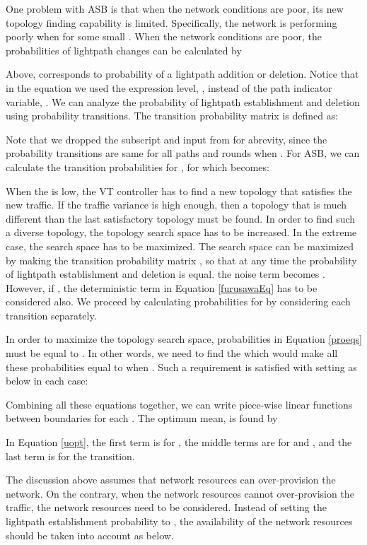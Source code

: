 \documentclass[conference]{IEEEtran}
\begin{document}
One problem with ASB is that when the network conditions are poor, its new topology finding capability is limited.
Specifically, the network is performing poorly when  for some small .
When the network conditions are poor, the probabilities of lightpath changes can be calculated by 
\par\nobreak \vspace{-0.24cm}
{\small }Above,  corresponds to probability of a lightpath addition or deletion.
Notice that in the equation we used the expression level, , instead of the path indicator variable, . We can analyze the probability of lightpath establishment and deletion using probability transitions.
The transition probability matrix  is defined as:
     
Note that we dropped the subscript  and input  from  for abrevity, since the probability transitions are same for all paths and 
 rounds when . For ASB,   we can calculate the transition probabilities for , for which   becomes: 
     
 
When the  is low, the VT controller has to find a new topology that satisfies the new traffic. 
If the traffic variance is high enough, then a topology that is much different than the last satisfactory topology must be found. 
In order to find such a diverse topology, the topology search space has to be increased. In the extreme case, the search space has to be maximized.
The search space can be maximized by making the transition probability matrix , so that at any time the probability of lightpath establishment and deletion is equal.
the noise term becomes .
However, if , the deterministic term in Equation \ref{furusawaEq} has to be considered also. 
We proceed by calculating probabilities for  by considering each transition separately. 
   
In order to maximize the topology search space, probabilities in Equation   \ref{proeqs}  must be equal to . 
In other words, we need to find the  which would make all these probabilities equal to  when .
 Such a requirement is satisfied with setting    as below in each case:
           
Combining all these equations together, we can write piece-wise linear functions between boundaries for each .
The optimum mean,  is found by 
   
\normalsize
In Equation \ref{uopt}, the first term is for , the middle terms are for  and  , and the last term is for the  transition.

The discussion above assumes that network resources can over-provision the network. On the contrary, when the network resources cannot over-provision the traffic, the network resources need to be considered.
Instead of setting the  lightpath establishment probability to , the availability of the network resources should be taken into account as below.
  
\end{document}
